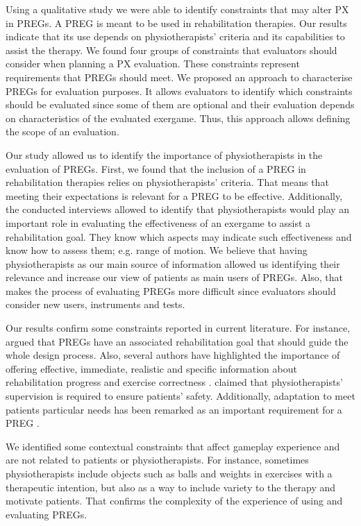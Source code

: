 Using a qualitative study we were able to identify constraints that may alter \ac{PX} in \acp{PREG}. A \ac{PREG} is meant to be used in rehabilitation therapies. Our results indicate that its use depends on physiotherapists' criteria and its capabilities to assist the therapy. We found four groups of constraints that evaluators should consider when planning a \ac{PX} evaluation. These constraints represent requirements that \acp{PREG} should meet. We proposed an approach to characterise \acp{PREG} for evaluation purposes. It allows evaluators to identify which constraints should be evaluated since some of them are optional and their evaluation depends on characteristics of the evaluated exergame. Thus, this approach allows defining the scope of an evaluation.

Our study allowed us to identify the importance of physiotherapists in the evaluation of \acp{PREG}. First, we found that the inclusion of a \ac{PREG} in rehabilitation therapies relies on physiotherapists' criteria. That means that meeting their expectations is relevant for a \ac{PREG} to be effective. Additionally, the conducted interviews allowed to identify that physiotherapists would play an important role in evaluating the effectiveness of an exergame to assist a rehabilitation goal. They know which aspects may indicate such effectiveness and know how to assess them; e.g. range of motion. We believe that having physiotherapists as our main source of information allowed us identifying their relevance and increase our view of patients as main users of \acp{PREG}. Also, that makes the process of evaluating \acp{PREG} more difficult since evaluators should consider new users, instruments and tests.

Our results confirm some constraints reported in current literature. For instance, \textcite{Pirovano2016} argued that \acp{PREG} have an associated rehabilitation goal that should guide the whole design process. Also, several authors have highlighted the importance of offering effective, immediate, realistic and specific information about rehabilitation progress and exercise correctness \autocite{Pirovano2016,Wiemeyer2015,Pasch2009}. \textcite{Wiemeyer2015} claimed that physiotherapists' supervision is required to ensure patients' safety. Additionally, adaptation to meet patients particular needs has been remarked as an important requirement for a \ac{PREG} \autocite{Pirovano2016,Wiemeyer2015,Sinclair2007,Ni2014,Cameirao2010,Nijholt2008,Mueller2011,Zhang2011}.

We identified some contextual constraints that affect gameplay experience and are not related to patients or physiotherapists. For instance, sometimes physiotherapists include objects such as balls and weights in exercises with a therapeutic intention, but also as a way to include variety to the therapy and motivate patients. That confirms the complexity of the experience of using and evaluating \acp{PREG}.

